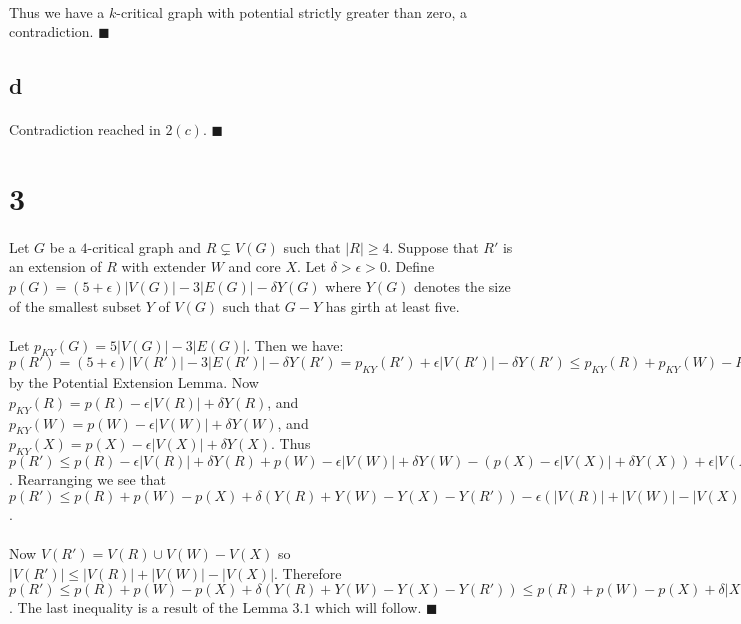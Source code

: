 \documentclass[letterpaper,12pt,oneside,onecolumn]{report}
\begin{document}
\paragraph{}
Thus we have a $k$-critical graph with potential strictly greater than zero, a contradiction. $\blacksquare$
\subsection*{d}
\paragraph{}
Contradiction reached in $2(c)$. $\blacksquare$

\section*{3}
\paragraph{}
Let $G$ be a $4$-critical graph and $R \subsetneq V(G)$ such that $|R| \geq 4$. Suppose that $R'$ is an extension of $R$ with extender $W$ and core $X$. Let $\delta > \epsilon > 0$. Define $p(G) = (5 + \epsilon)|V(G)| - 3|E(G)| - \delta Y(G)$ where $Y(G)$ denotes the size of the smallest subset $Y$ of $V(G)$ such that $G-Y$ has girth at least five. 
\paragraph{}
Let $p_{KY}(G) = 5|V(G)| - 3|E(G)|$. Then we have: $p(R') = (5 + \epsilon)|V(R')| - 3|E(R')| - \delta Y(R') = p_{KY}(R') + \epsilon |V(R')| - \delta Y(R') \leq p_{KY}(R) + p_{KY}(W) -P_{KY}(X) + \epsilon|V(R')| - \delta Y(R')$ by the Potential Extension Lemma. Now $p_{KY}(R) = p(R) - \epsilon|V(R)| + \delta Y(R)$, and $p_{KY}(W) = p(W) - \epsilon|V(W)| + \delta Y(W)$, and $p_{KY}(X) = p(X) - \epsilon|V(X)| + \delta Y(X)$. Thus $p(R') \leq p(R) - \epsilon|V(R)| + \delta Y(R) + p(W) - \epsilon|V(W)| + \delta Y(W) - (p(X) - \epsilon|V(X)| + \delta Y(X)) + \epsilon|V(R')| -\delta Y(R')$. Rearranging we see that $p(R') \leq  p(R) + p(W) - p(X) + \delta (Y(R) + Y(W) - Y(X) - Y(R')) - \epsilon(|V(R)| + |V(W)| - |V(X)| - |V(R')|)$.
\paragraph{}
Now $V(R') = V(R) \cup V(W) - V(X)$ so $|V(R')| \leq |V(R)| + |V(W)| - |V(X)|$. Therefore $p(R') \leq  p(R) + p(W) - p(X) + \delta (Y(R) + Y(W) - Y(X) - Y(R')) \leq p(R) + p(W) - p(X) +\delta |X|$. The last inequality is a result of the Lemma $3.1$ which will follow. $\blacksquare$ 
\end{document}
